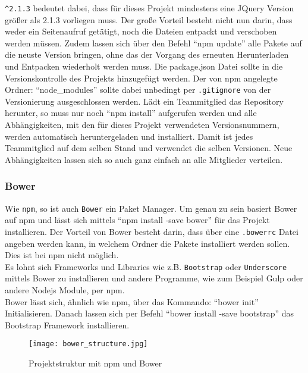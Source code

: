 			\texttt{\textasciicircum 2.1.3} bedeutet dabei, dass für dieses Projekt mindestens eine JQuery Version größer als 2.1.3 vorliegen muss. Der große Vorteil besteht nicht nun darin, dass weder ein Seitenaufruf getätigt, noch die Dateien entpackt und verschoben werden müssen. Zudem lassen sich über den Befehl "`npm update"' alle Pakete auf die neuste Version bringen, ohne das der Vorgang des erneuten Herunterladen und Entpacken wiederholt werden muss. Die package.json Datei sollte in die Versionskontrolle des Projekts hinzugefügt werden. Der von npm angelegte Ordner: "`node\_modules"' sollte dabei unbedingt per \texttt{.gitignore} von der Versionierung ausgeschlossen werden. Lädt ein Teammitglied das Repository herunter, so muss nur noch "`npm install"' aufgerufen werden und alle Abhängigkeiten, mit den für dieses Projekt verwendeten Versionsnummern, werden automatisch heruntergeladen und installiert. Damit ist jedes Teammitglied auf dem selben Stand und verwendet die selben Versionen. Neue Abhängigkeiten lassen sich so auch ganz einfach an alle Mitglieder verteilen.
			

		\subsubsection{Bower} %
		\label{ssub:bower}
			Wie \texttt{npm}, so ist auch \texttt{Bower} ein Paket Manager. Um genau zu sein basiert Bower auf npm und lässt sich mittels "`npm install -save bower"' für das Projekt installieren. Der Vorteil von Bower besteht darin, dass über eine \texttt{.bowerrc} Datei angeben werden kann, in welchem Ordner die Pakete installiert werden sollen. Dies ist bei npm nicht möglich.\\
			Es lohnt sich Frameworks und Libraries wie z.B. \texttt{Bootstrap} oder \texttt{Underscore} mittels Bower zu installieren und andere Programme, wie zum Beispiel Gulp oder andere Nodejs Module, per npm.\\
			Bower lässt sich, ähnlich wie npm, über das Kommando: "`bower init"' Initialisieren. Danach lassen sich per Befehl "`bower install -save bootstrap"' das Bootstrap Framework installieren. 

			\begin{figure}[htbp]
				\begin{center}
					\texttt{[image: bower\_structure.jpg]}
					\caption{Projektstruktur mit npm und Bower}
					\label{fig:bower_structure}
				\end{center}
			\end{figure}
			
